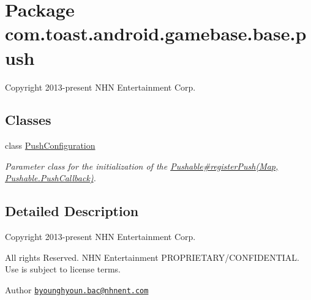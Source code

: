 \hypertarget{namespacecom_1_1toast_1_1android_1_1gamebase_1_1base_1_1push}{}\section{Package com.\+toast.\+android.\+gamebase.\+base.\+push}
\label{namespacecom_1_1toast_1_1android_1_1gamebase_1_1base_1_1push}


Copyright 2013-\/present N\+HN Entertainment Corp.  


\subsection*{Classes}
\begin{DoxyCompactItemize}
\item 
class \hyperlink{classcom_1_1toast_1_1android_1_1gamebase_1_1base_1_1push_1_1_push_configuration}{Push\+Configuration}
\begin{DoxyCompactList}\small\item\em Parameter class for the initialization of the \hyperlink{}{Pushable\#register\+Push(\+Map, Pushable.\+Push\+Callback)}. \end{DoxyCompactList}\end{DoxyCompactItemize}


\subsection{Detailed Description}
Copyright 2013-\/present N\+HN Entertainment Corp. 

All rights Reserved. N\+HN Entertainment P\+R\+O\+P\+R\+I\+E\+T\+A\+R\+Y/\+C\+O\+N\+F\+I\+D\+E\+N\+T\+I\+AL. Use is subject to license terms.

\begin{DoxyAuthor}{Author}
\href{mailto:byounghyoun.bac@nhnent.com}{\tt byounghyoun.\+bac@nhnent.\+com} 
\end{DoxyAuthor}

